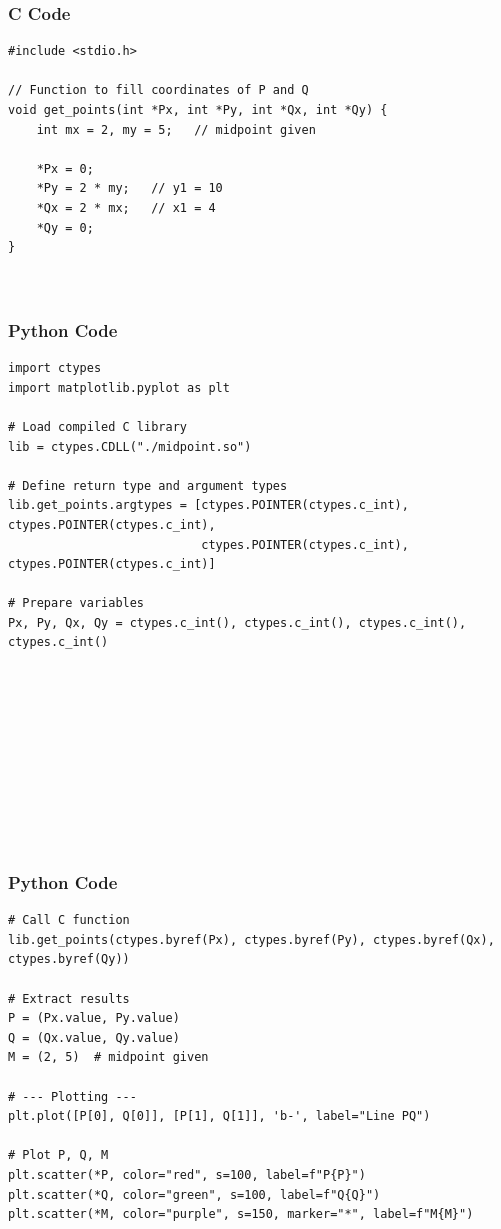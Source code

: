 \documentclass{beamer}
\begin{document}
\begin{frame}[fragile]
    \frametitle{C Code  }

    \begin{lstlisting}
#include <stdio.h>

// Function to fill coordinates of P and Q
void get_points(int *Px, int *Py, int *Qx, int *Qy) {
    int mx = 2, my = 5;   // midpoint given

    *Px = 0;
    *Py = 2 * my;   // y1 = 10
    *Qx = 2 * mx;   // x1 = 4
    *Qy = 0;
}



    \end{lstlisting}
\end{frame}


\begin{frame}[fragile]
    \frametitle{Python Code}
    \begin{lstlisting}
import ctypes
import matplotlib.pyplot as plt

# Load compiled C library
lib = ctypes.CDLL("./midpoint.so")

# Define return type and argument types
lib.get_points.argtypes = [ctypes.POINTER(ctypes.c_int), ctypes.POINTER(ctypes.c_int),
                           ctypes.POINTER(ctypes.c_int), ctypes.POINTER(ctypes.c_int)]

# Prepare variables
Px, Py, Qx, Qy = ctypes.c_int(), ctypes.c_int(), ctypes.c_int(), ctypes.c_int()











    \end{lstlisting}
\end{frame}

\begin{frame}[fragile]
    \frametitle{Python Code}
    \begin{lstlisting}
# Call C function
lib.get_points(ctypes.byref(Px), ctypes.byref(Py), ctypes.byref(Qx), ctypes.byref(Qy))

# Extract results
P = (Px.value, Py.value)
Q = (Qx.value, Qy.value)
M = (2, 5)  # midpoint given

# --- Plotting ---
plt.plot([P[0], Q[0]], [P[1], Q[1]], 'b-', label="Line PQ")

# Plot P, Q, M
plt.scatter(*P, color="red", s=100, label=f"P{P}")
plt.scatter(*Q, color="green", s=100, label=f"Q{Q}")
plt.scatter(*M, color="purple", s=150, marker="*", label=f"M{M}")













    \end{lstlisting}
\end{frame}
\end{document}
